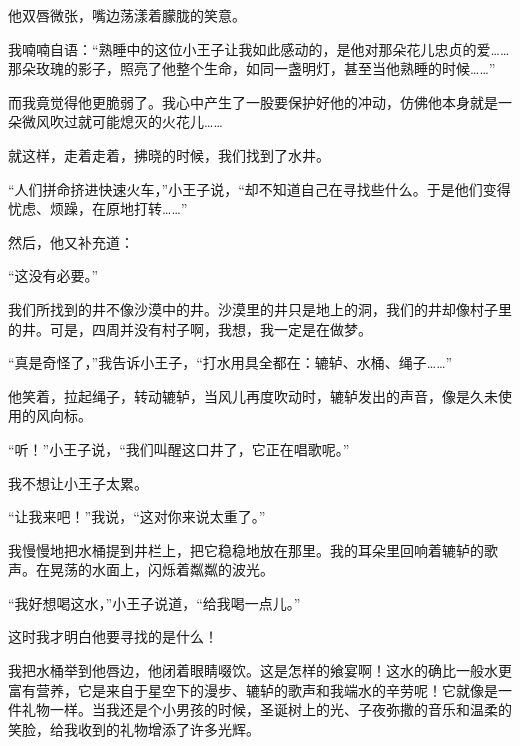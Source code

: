 他双唇微张，嘴边荡漾着朦胧的笑意。

我喃喃自语：“熟睡中的这位小王子让我如此感动的，是他对那朵花儿忠贞的爱\ldots{}\ldots{}那朵玫瑰的影子，照亮了他整个生命，如同一盏明灯，甚至当他熟睡的时候\ldots{}\ldots{}”

而我竟觉得他更脆弱了。我心中产生了一股要保护好他的冲动，仿佛他本身就是一朵微风吹过就可能熄灭的火花儿\ldots{}\ldots{}

{\startalignment[center]
 \stopalignment}

就这样，走着走着，拂晓的时候，我们找到了水井。


\stoptitle

\starttitle[title={25}]

“人们拼命挤进快速火车，”小王子说，“却不知道自己在寻找些什么。于是他们变得忧虑、烦躁，在原地打转\ldots{}\ldots{}”

然后，他又补充道：

“这没有必要。”

我们所找到的井不像沙漠中的井。沙漠里的井只是地上的洞，我们的井却像村子里的井。可是，四周并没有村子啊，我想，我一定是在做梦。

“真是奇怪了，”我告诉小王子，“打水用具全都在：辘轳、水桶、绳子\ldots{}\ldots{}”

他笑着，拉起绳子，转动辘轳，当风儿再度吹动时，辘轳发出的声音，像是久未使用的风向标。

{\startalignment[center]
 \stopalignment}

“听！”小王子说，“我们叫醒这口井了，它正在唱歌呢。”

我不想让小王子太累。

“让我来吧！”我说，“这对你来说太重了。”

我慢慢地把水桶提到井栏上，把它稳稳地放在那里。我的耳朵里回响着辘轳的歌声。在晃荡的水面上，闪烁着粼粼的波光。

“我好想喝这水，”小王子说道，“给我喝一点儿。”

这时我才明白他要寻找的是什么！

我把水桶举到他唇边，他闭着眼睛啜饮。这是怎样的飨宴啊！这水的确比一般水更富有营养，它是来自于星空下的漫步、辘轳的歌声和我端水的辛劳呢！它就像是一件礼物一样。当我还是个小男孩的时候，圣诞树上的光、子夜弥撒的音乐和温柔的笑脸，给我收到的礼物增添了许多光辉。

